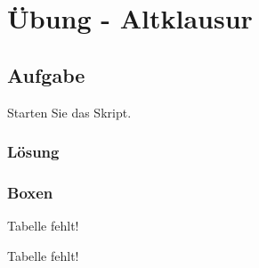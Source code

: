 \section{Übung - Altklausur}
\label{sec:uebung_01}

\subsection{Aufgabe}
\label{subsec:uebung_01.aufgabe_01}
Starten Sie das Skript.

\subsubsection*{Lösung}
\label{subsubsec:uebung_01.aufgabe_01.loesung}


\subsubsection*{Boxen}
\begin{WARN}
  Tabelle fehlt!
\end{WARN}

\begin{INFO}
  Tabelle fehlt!
\end{INFO}